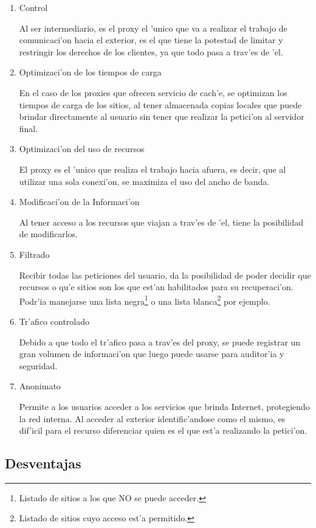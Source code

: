 \begin{enumerate}
\item Control

Al ser intermediario, es el proxy el 'unico que va a realizar el trabajo de comunicaci'on hacia el exterior, es el que tiene la potestad de limitar y restringir los derechos de los clientes, ya que todo pasa a trav'es de 'el.
\clearpage
\item Optimizaci'on de los tiempos de carga

En el caso de los proxies que ofrecen servicio de cach'e, se optimizan los tiempos de carga de los sitios, al tener almacenada copias locales que puede brindar directamente al usuario sin tener que realizar la petici'on al servidor final.
\item Optimizaci'on del uso de recursos

El proxy es el 'unico que realiza el trabajo hacia afuera, es decir, que al utilizar una sola conexi'on, se maximiza el uso del ancho de banda.
\item Modificaci'on de la Informaci'on

Al tener acceso a los recursos que viajan a trav'es de 'el, tiene la posibilidad de modificarlos.
\item Filtrado

Recibir todas las peticiones del usuario, da la posibilidad de poder decidir que recursos o qu'e sitios son los que est'an habilitados para su recuperaci'on. Podr'ia manejarse una lista negra\footnote{Listado de sitios a los que NO se puede acceder.} o una lista blanca\footnote{Listado de sitios cuyo acceso est'a permitido.} por ejemplo.

\item Tr'afico controlado

Debido a que todo el tr'afico pasa a trav'es del proxy, se puede registrar un gran volumen de informaci'on que luego puede usarse para auditor'ia y seguridad.
\item Anonimato

Permite a los usuarios acceder a los servicios que brinda Internet, protegiendo la red interna. Al acceder al exterior identific'andose como el mismo, es dif'icil para el recurso diferenciar quien es el que est'a realizando la petici'on.
\end{enumerate}
\clearpage
\subsection{Desventajas}

